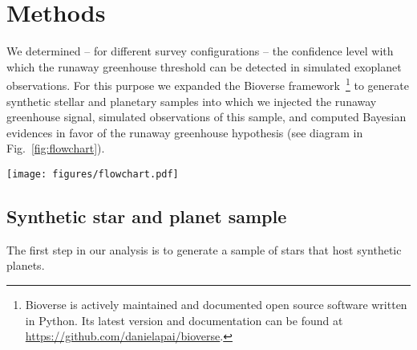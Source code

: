 \documentclass[modern]{aastex631}
\begin{document}
\section{Methods}\label{sec:methods}

We determined -- for different survey configurations -- the confidence level with which the runaway greenhouse threshold can be detected in simulated exoplanet observations.
For this purpose we expanded the Bioverse framework~\citep{Bixel2020,Bixel2021}\footnote{Bioverse is actively maintained and documented open source software written in Python. Its latest version and documentation can be found at \url{https://github.com/danielapai/bioverse}.} to generate synthetic stellar and planetary samples into which we injected the runaway greenhouse signal, simulated observations of this sample, and computed Bayesian evidences in favor of the runaway greenhouse hypothesis (see diagram in Fig.~\ref{fig:flowchart}).
\begin{figure*}
    \begin{centering}
        \texttt{[image: figures/flowchart.pdf]}
        \caption{Workflow of our hypothesis testing with Bioverse. In the first block, we generate a sample of stars and populate them with planets based on \kepler\ demographics.
            A fraction of them are then assigned a runaway greenhouse climate based on the model described in Sect.~\ref{sec:mo_model}.
        The second block simulates an exoplanet survey, whereby selection effects and detection biases are introduced. Finally, the third block deals with testing the runaway greenhouse hypothesis based on data from the survey simulation.
        By iterating through these steps, we compute the statistical power of testing the hypothesis given the assumed survey design.}
        \label{fig:flowchart}
    \end{centering}
\end{figure*}



\subsection{Synthetic star and planet sample}
The first step in our analysis is to generate a sample of stars that host synthetic planets.
\end{document}
